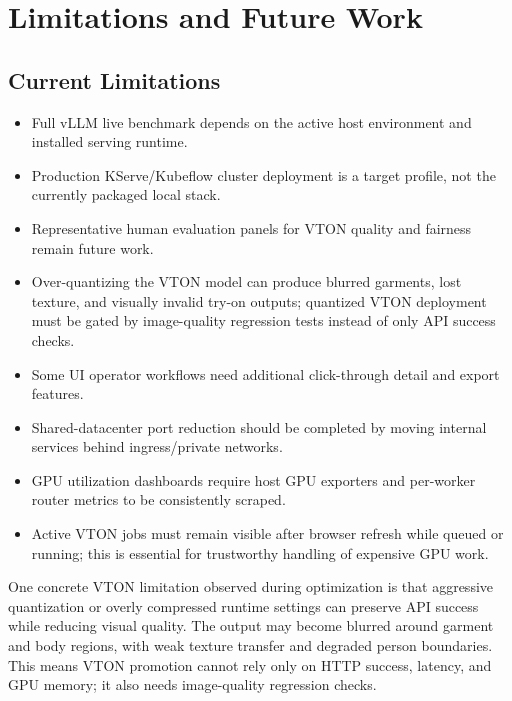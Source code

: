 \documentclass[12pt,a4paper,oneside]{report}
\begin{document}
\chapter{Limitations and Future Work}

\section{Current Limitations}

\begin{itemize}
  \item Full vLLM live benchmark depends on the active host environment and installed serving runtime.
  \item Production KServe/Kubeflow cluster deployment is a target profile, not the currently packaged local stack.
  \item Representative human evaluation panels for VTON quality and fairness remain future work.
  \item Over-quantizing the VTON model can produce blurred garments, lost texture, and visually invalid try-on outputs; quantized VTON deployment must be gated by image-quality regression tests instead of only API success checks.
  \item Some UI operator workflows need additional click-through detail and export features.
  \item Shared-datacenter port reduction should be completed by moving internal services behind ingress/private networks.
  \item GPU utilization dashboards require host GPU exporters and per-worker router metrics to be consistently scraped.
  \item Active VTON jobs must remain visible after browser refresh while queued or running; this is essential for trustworthy handling of expensive GPU work.
\end{itemize}

One concrete VTON limitation observed during optimization is that aggressive quantization or overly compressed runtime settings can preserve API success while reducing visual quality. The output may become blurred around garment and body regions, with weak texture transfer and degraded person boundaries. This means VTON promotion cannot rely only on HTTP success, latency, and GPU memory; it also needs image-quality regression checks.
\end{document}
